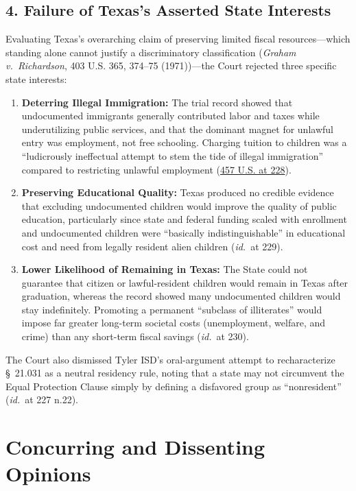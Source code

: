 \documentclass[12pt]{article}
\begin{document}
\subsection*{4. Failure of Texas's Asserted State Interests}
Evaluating Texas's overarching claim of preserving limited fiscal resources---which standing alone cannot justify a discriminatory classification (\textit{Graham v.\ Richardson}, 403 U.S. 365, 374--75 (1971))---the Court rejected three specific state interests:
\begin{enumerate}
    \item \textbf{Deterring Illegal Immigration:} The trial record showed that undocumented immigrants generally contributed labor and taxes while underutilizing public services, and that the dominant magnet for unlawful entry was employment, not free schooling. Charging tuition to children was a ``ludicrously ineffectual attempt to stem the tide of illegal immigration'' compared to restricting unlawful employment (\href{https://www.law.cornell.edu/supremecourt/text/457/202}{457 U.S. at 228}).
    \item \textbf{Preserving Educational Quality:} Texas produced no credible evidence that excluding undocumented children would improve the quality of public education, particularly since state and federal funding scaled with enrollment and undocumented children were ``basically indistinguishable'' in educational cost and need from legally resident alien children (\textit{id.}\ at 229).
    \item \textbf{Lower Likelihood of Remaining in Texas:} The State could not guarantee that citizen or lawful-resident children would remain in Texas after graduation, whereas the record showed many undocumented children would stay indefinitely. Promoting a permanent ``subclass of illiterates'' would impose far greater long-term societal costs (unemployment, welfare, and crime) than any short-term fiscal savings (\textit{id.}\ at 230).
\end{enumerate}

The Court also dismissed Tyler ISD's oral-argument attempt to recharacterize \S~21.031 as a neutral residency rule, noting that a state may not circumvent the Equal Protection Clause simply by defining a disfavored group as ``nonresident'' (\textit{id.}\ at 227 n.22).

\section{Concurring and Dissenting Opinions}
\end{document}
